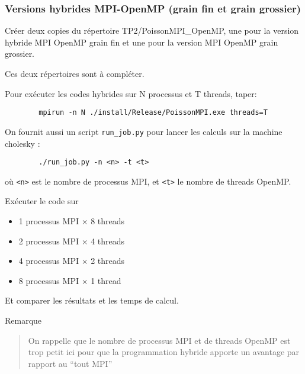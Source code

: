 \documentclass{beamer}
\begin{document}
\begin{frame}[fragile]
	\frametitle{Versions hybrides MPI-OpenMP (grain fin et grain grossier)}
	
Créer deux copies du répertoire TP2/PoissonMPI\_OpenMP, une pour la version hybride MPI OpenMP grain fin et une pour la version  MPI OpenMP grain grossier.
 
\vfill
Ces deux répertoires sont à compléter.

\vfill
Pour exécuter les codes hybrides sur N processus et T threads, taper:

{\color{blue}\begin{verbatim}
		mpirun -n N ./install/Release/PoissonMPI.exe threads=T
	\end{verbatim}
}

\vfill

\end{frame}


\begin{frame}[fragile]
	On fournit aussi un script \texttt{run\_job.py} pour lancer les calculs sur la machine cholesky :
	
	{\color{blue}\begin{verbatim}
		./run_job.py -n <n> -t <t>
		\end{verbatim}
	}
	
	où \texttt{<n>} est le nombre de processus MPI, et \texttt{<t>} le nombre de threads OpenMP.

\vfill
    Exécuter le code sur 
    \begin{itemize}
    	\item 1 processus MPI $\times$ 8 threads
    	\item 2 processus MPI $\times$ 4 threads
    	\item 4 processus MPI $\times$ 2 threads
    	\item 8 processus MPI $\times$ 1 thread
    \end{itemize}
 	
 	Et comparer les résultats et les temps de calcul.
 	
\end{frame}

\begin{frame}
 	Remarque
 	\begin{quote}
 		On rappelle que le nombre de processus MPI et de threads OpenMP est trop petit ici pour que la programmation hybride apporte un avantage par rapport au ``tout MPI''
 	\end{quote}
\end{frame}
\end{document}
